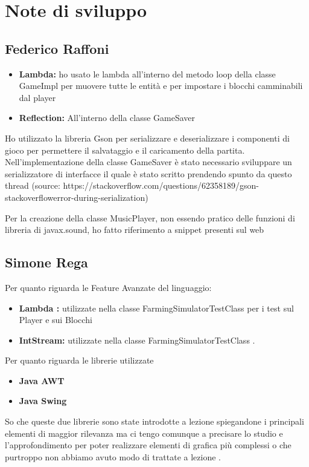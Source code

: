 \documentclass[a4paper,12pt]{report}
\begin{document}
\section{Note di sviluppo}

\subsection{Federico Raffoni}

\begin{itemize}
	\item \textbf{Lambda:} ho usato le lambda all’interno del metodo loop della classe GameImpl per muovere tutte le entità e per impostare i blocchi camminabili dal player
	\item\textbf{Reflection:} All’interno della classe GameSaver
\end{itemize}

Ho utilizzato la libreria Gson per serializzare e deserializzare i componenti di gioco per permettere il salvataggio e il caricamento della partita.
Nell’implementazione della classe GameSaver è stato necessario sviluppare un serializzatore di interfacce il quale è stato scritto prendendo spunto da questo thread (source: https://stackoverflow.com/questions/62358189/gson-stackoverflowerror-during-serialization)

Per la creazione della classe MusicPlayer, non essendo pratico delle funzioni di libreria di javax.sound, ho fatto riferimento a snippet presenti sul web


\subsection{Simone Rega}
Per quanto riguarda le Feature Avanzate del linguaggio: 
\begin{itemize}
	\item \textbf{Lambda :} utilizzate nella classe FarmingSimulatorTestClass per i test sul Player e sui Blocchi	
	\item \textbf{IntStream: }utilizzate nella classe FarmingSimulatorTestClass .
\end{itemize}

\hfill\break
Per quanto riguarda le librerie utilizzate
\begin{itemize}
	\item \textbf{Java AWT }
	\item \textbf{Java Swing}
\end{itemize}
So che queste due librerie sono state introdotte a lezione spiegandone i principali elementi di maggior rilevanza ma ci tengo comunque a precisare lo studio e l'approfondimento per poter realizzare elementi di grafica più complessi o che purtroppo non abbiamo avuto modo di trattate a lezione .
 
\end{document}
